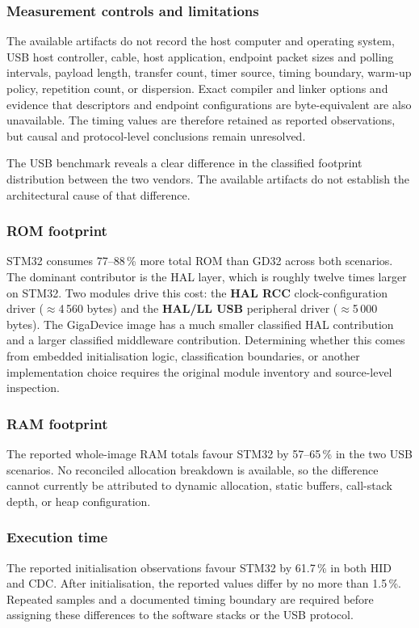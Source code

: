 \subsubsection*{Measurement controls and limitations}
The available artifacts do not record the host computer and operating system, USB host
controller, cable, host application, endpoint packet sizes and polling intervals, payload
length, transfer count, timer source, timing boundary, warm-up policy, repetition count, or
dispersion. Exact compiler and linker options and evidence that descriptors and endpoint
configurations are byte-equivalent are also unavailable. The timing values are therefore
retained as reported observations, but causal and protocol-level conclusions remain
unresolved.

The USB benchmark reveals a clear difference in the classified footprint distribution between
the two vendors. The available artifacts do not establish the architectural cause of that
difference.

\subsubsection*{ROM footprint}
STM32 consumes 77--88\,\% more total ROM than GD32 across both scenarios. The dominant
contributor is the HAL layer, which is roughly twelve times larger on STM32. Two modules
drive this cost: the \textbf{HAL RCC} clock-configuration driver ($\approx$4\,560 bytes)
and the \textbf{HAL/LL USB} peripheral driver ($\approx$5\,000 bytes). The GigaDevice image
has a much smaller classified HAL contribution and a larger classified middleware
contribution. Determining whether this comes from embedded initialisation logic,
classification boundaries, or another implementation choice requires the original module
inventory and source-level inspection.

\subsubsection*{RAM footprint}
The reported whole-image RAM totals favour STM32 by 57--65\,\% in the two USB scenarios.
No reconciled allocation breakdown is available, so the difference cannot currently be
attributed to dynamic allocation, static buffers, call-stack depth, or heap configuration.

\subsubsection*{Execution time}
The reported initialisation observations favour STM32 by 61.7\,\% in both HID and CDC.
After initialisation, the reported values differ by no more than 1.5\,\%. Repeated samples
and a documented timing boundary are required before assigning these differences to the
software stacks or the USB protocol.

